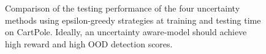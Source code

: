 \begin{figure}
\begin{subfigure}{.4\textwidth}
    \end{subfigure}
        \vspace{-3mm}
    \caption{Comparison of the testing performance of the four uncertainty methods using epsilon-greedy strategies at training and testing time on CartPole. Ideally, an uncertainty aware-model should achieve high reward and high OOD detection scores.}
    \label{fig:model-testing-performance-cartpole}
    \vspace{-4mm}
\end{figure}